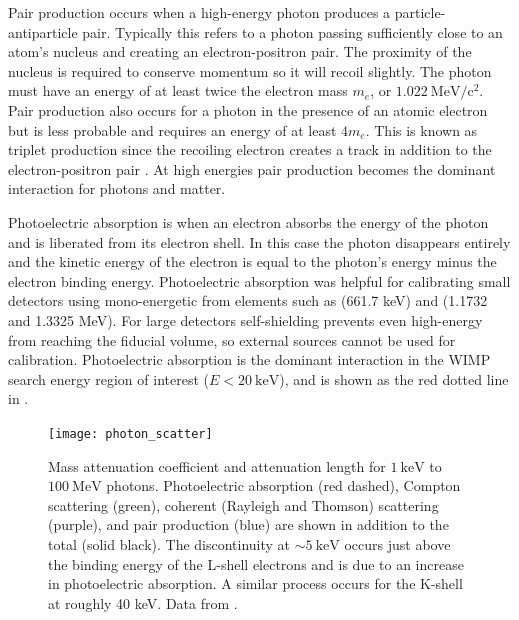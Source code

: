Pair production occurs when a high-energy photon produces a particle-antiparticle pair.  Typically this refers to a photon passing
sufficiently
close to an atom's nucleus and creating an electron-positron pair.  The proximity of the nucleus is required to conserve momentum so it
will recoil slightly.  The photon must have an energy of at least twice the electron mass $m_{e}$, or $1.022\ \mathrm{MeV/c^2}$.  Pair
production
also occurs for a photon in the presence of an atomic electron but is less probable and requires an energy of at least $4m_{e}$.  This
is known as triplet production since the recoiling electron creates a track in addition to the electron-positron pair
.  At high energies pair production becomes the dominant interaction for photons and matter.

Photoelectric absorption is when an electron absorbs the energy of the photon and is liberated from its electron shell.  In this case the
photon disappears entirely and the kinetic energy of the electron is equal to the photon's energy minus the electron binding
energy.  Photoelectric absorption was helpful for calibrating small detectors using mono-energetic \gammarays from elements such as
\cesium (661.7 keV) and \cobaltsixty
(1.1732 and 1.3325 MeV).  For large detectors self-shielding prevents even high-energy \gammarays from reaching the fiducial
volume, so external sources cannot be used for calibration.  Photoelectric absorption is the dominant interaction in the WIMP search
energy region of interest ($E < 20\ \mathrm{keV}$), and is shown as the red dotted line in .

\begin{figure}
 \centering
 \texttt{[image: photon\_scatter]}
 \caption[Mass attenuation coefficient and attenuation length for $1\ \mathrm{keV}$ to $100\ \mathrm{MeV}$ photons.  Photoelectric
 absorption, Compton scattering, coherent (Rayleigh and Thomson) scattering, and pair production are
 shown in addition to the total.]{Mass attenuation coefficient and attenuation length for $1\ \mathrm{keV}$ to
 $100\ \mathrm{MeV}$ photons.  Photoelectric
 absorption (red dashed), Compton scattering (green), coherent (Rayleigh and Thomson) scattering (purple), and pair production (blue) are
 shown in addition to the total (solid black).  The discontinuity at ${\sim}5\ \mathrm{keV}$ occurs just above the binding energy of the
 L-shell electrons and is due to an increase in photoelectric absorption.  A similar process occurs for the K-shell at
 roughly 40 keV.  Data from .}
 \label{fig:phot_atten}
\end{figure}


